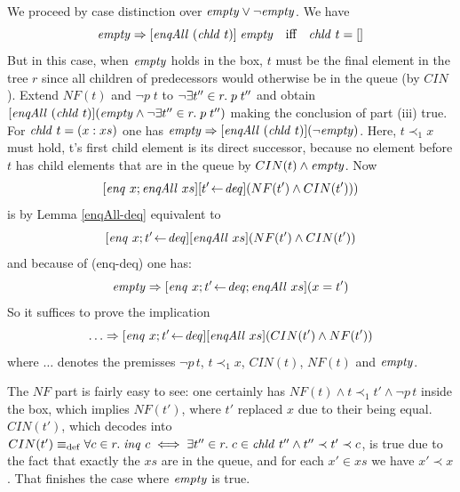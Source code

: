 We proceed by case distinction over $\mathit{empty} \lor\lnot \mathit{empty}$. We have 
\[ \mathit{empty} \Rightarrow [\mathit{enqAll}~(\mathit{chld}~t)]\;\mathit{empty} \quad\text{iff}\quad \mathit{chld}~t = []
\]
 But in this case, \IE when $\mathit{empty}$ holds in the box, $t$
must be the final element in the tree $r$ since all children of predecessors
would otherwise be in the queue (by $CIN$). Extend $NF(t)$ and $\lnot p\;t$ to $\lnot \exists
t''\in r.\; p\;t''$ and obtain $[\mathit{enqAll}~(\mathit{chld}~t)](\mathit{empty} \land \lnot \exists t''\in r.\;
p\;t'')$ making the conclusion of part (iii) true. For $\mathit{chld}~t = (x:xs)$
one has $\mathit{empty} \Rightarrow [\mathit{enqAll}~(\mathit{chld}~t)](\lnot \mathit{empty})$. Here, $t \prec_1 x$ must hold, \IE
t's first child element is its direct successor, because no element before $t$
has child elements that are in the queue by $CIN(t) \land \mathit{empty}$.  Now
\[
[\mathit{enq}~x; \mathit{enqAll}~xs][t' \!\gets\! \mathit{deq}](NF(t') \land CIN(t')))
\]
is by Lemma \ref{enqAll-deq} equivalent to 
\[
[\mathit{enq}~x; t' \!\gets\! \mathit{deq}][\mathit{enqAll}~xs](NF(t') \land CIN(t'))
\]
and because of (enq-deq) one has:
\[
\mathit{empty} \Rightarrow [\mathit{enq}~x; t' \!\gets\! \mathit{deq}; \mathit{enqAll}\ xs](x = t')
\]
So it suffices to prove the implication
\[ 
\ldots \Rightarrow [\mathit{enq}~x; t'\!\gets\!\mathit{deq}][\mathit{enqAll}~xs](CIN(t') \land NF(t'))
\]
where $\ldots$ denotes the premisses $\lnot p\,t$, $t {\prec}_1 x$, $CIN(t)$, $NF(t)$ and
$\mathit{empty}$.

The $NF$ part is fairly easy to see: one certainly has $NF(t) \land t {\prec}_1 t' \land \lnot
p\,t$ inside the box, which implies $NF(t')$, where $t'$ replaced $x$ due to
their being equal.  $CIN(t')$, which decodes into $CIN(t') \equiv_{\mathrm{def}}
\forall c\in r.\; \mathit{inq}~c \iff \exists t'' \in r.\; c\in \mathit{chld}~t'' \land t'' \prec t' \prec c$, is true due to the
fact that exactly the $xs$ are in the queue, and for each $x' \in xs$ we have $x'
{\prec} x$. That finishes the case where $\mathit{empty}$ is true.

